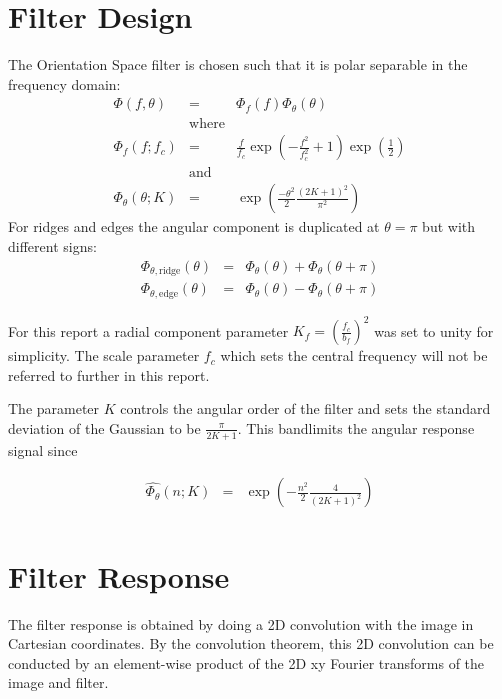 \documentclass{article}
\begin{document}
\section{Filter Design}
The Orientation Space filter is chosen such that it is polar separable in the frequency domain:
\begin{eqnarray}
    \Phi(f,\theta) & = & \Phi_f(f) \Phi_\theta(\theta) \\
    & \mbox{where} & \nonumber \\
    \Phi_f(f; f_c) & = & \frac{f}{f_c} \exp(-\frac{f^2}{f_c^2}+1) \exp(\frac{1}{2}) \\
    & \mbox{and} & \nonumber \\
    \Phi_\theta(\theta; K) & = & \exp \left(\frac{-\theta^2}{2} \frac{(2K+1)^2}{\pi^2} \right)
\end{eqnarray}
For ridges and edges the angular component is duplicated at $ \theta = \pi $ but with different signs:
\begin{eqnarray}
    \Phi_{\theta,\mbox{ridge}}(\theta) & = & \Phi_{\theta}(\theta) + \Phi_{\theta}(\theta+\pi) \\
    \Phi_{\theta,\mbox{edge}}(\theta) & = & \Phi_{\theta}(\theta) - \Phi_{\theta}(\theta+\pi)
\end{eqnarray}

For this report a radial component parameter $ K_f = (\frac{f_c}{b_f})^2 $ was set to unity for simplicity. The scale parameter $ f_c $ which sets the central frequency will not be referred to further in this report.

The parameter $ K $ controls the angular order of the filter and sets the standard deviation of the Gaussian to be $ \frac{\pi}{2K+1} $. This bandlimits the angular response signal since

\begin{eqnarray}
    \widehat{\Phi_{\theta}}(n ; K) & = & \exp\left(-\frac{n^2}{2} \frac{4}{(2K+1)^2}\right)\\
\end{eqnarray}

\section{Filter Response}

The filter response is obtained by doing a 2D convolution with the image in Cartesian coordinates. By the convolution theorem, this 2D convolution can be conducted by an element-wise product of the 2D xy Fourier transforms of the image and filter.
\end{document}
